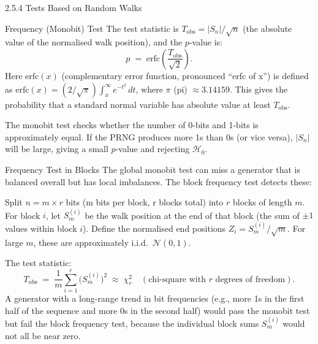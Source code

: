 \documentclass[aspectratio=169,10pt]{beamer}
\begin{document}
\begin{frame}[allowframebreaks]{2.5.4 Tests Based on Random Walks}
\begin{block}{Frequency (Monobit) Test}
The test statistic is $T_{\mathrm{obs}} = |S_n| / \sqrt{n}$ (the absolute
value of the normalised walk position), and the $p$-value is:
\[
  p \;=\; \mathrm{erfc}\!\left(\frac{T_{\mathrm{obs}}}{\sqrt{2}}\right).
\]
Here $\mathrm{erfc}(x)$ (complementary error function, pronounced
``erfc of x'') is defined as
$\mathrm{erfc}(x) = (2/\sqrt{\pi})\int_x^\infty e^{-t^2}\,dt$, where
$\pi$ (pi) $\approx 3.14159$.  This gives the probability that a standard
normal variable has absolute value at least $T_{\mathrm{obs}}$.

The monobit test checks whether the number of 0-bits and 1-bits is
approximately equal.  If the PRNG produces more 1s than 0s (or vice versa),
$|S_n|$ will be large, giving a small $p$-value and rejecting $\mathcal{H}_0$.
\end{block}

\begin{block}{Frequency Test in Blocks}
The global monobit test can miss a generator that is balanced overall but
has local imbalances.  The block frequency test detects these:

Split $n = m \times r$ bits (m bits per block, r blocks total) into $r$
blocks of length $m$.  For block $i$, let $S_m^{(i)}$ be the walk position
at the end of that block (the sum of $\pm 1$ values within block $i$).
Define the normalised end positions $Z_i = S_m^{(i)} / \sqrt{m}$.  For
large $m$, these are approximately i.i.d.\ $\mathcal{N}(0,1)$.

The test statistic:
\[
  T_{\mathrm{obs}} \;=\; \frac{1}{m}\sum_{i=1}^r \bigl(S_m^{(i)}\bigr)^2
  \;\approx\; \chi^2_r \quad (\text{chi-square with }r\text{ degrees of freedom}).
\]
A generator with a long-range trend in bit frequencies (e.g., more 1s in
the first half of the sequence and more 0s in the second half) would pass
the monobit test but fail the block frequency test, because the individual
block sums $S_m^{(i)}$ would not all be near zero.
\end{block}

\framebreak


\end{frame}
\end{document}
